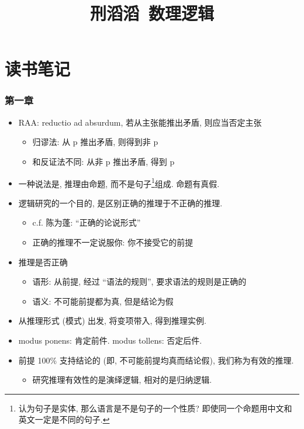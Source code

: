 \documentclass[a4paper]{article}
\title{刑滔滔~数理逻辑}
\begin{document}
\maketitle

\part{读书笔记}

\section{第一章}
\begin{itemize}
\item RAA: reductio ad absurdum, 若从主张能推出矛盾, 则应当否定主张 \begin{itemize}
  \item 归谬法: 从 p 推出矛盾, 则得到非 p
  \item 和反证法不同: 从非 p 推出矛盾, 得到 p
  \end{itemize}

\item 一种说法是, 推理由命题, 而不是句子\footnote{认为句子是实体, 那么语言是不是句子的一个性质? 即使同一个命题用中文和英文一定是不同的句子.}组成. 命题有真假.

\item 逻辑研究的一个目的, 是区别正确的推理于不正确的推理. \begin{itemize}
  \item c.f. 陈为蓬: ``正确的论说形式''
  \item 正确的推理不一定说服你: 你不接受它的前提
  \end{itemize}

\item 推理是否正确 \begin{itemize}
  \item 语形: 从前提, 经过 ``语法的规则'', 要求语法的规则是正确的
  \item 语义: 不可能前提都为真, 但是结论为假
  \end{itemize}

\item 从推理形式 (模式) 出发, 将变项带入, 得到推理实例.

\item modus ponens: 肯定前件. modus tollens: 否定后件.

\item 前提 100\% 支持结论的 (即, 不可能前提均真而结论假), 我们称为有效的推理. \begin{itemize}
  \item 研究推理有效性的是演绎逻辑, 相对的是归纳逻辑.
  \end{itemize}


\end{itemize}
\end{document}
